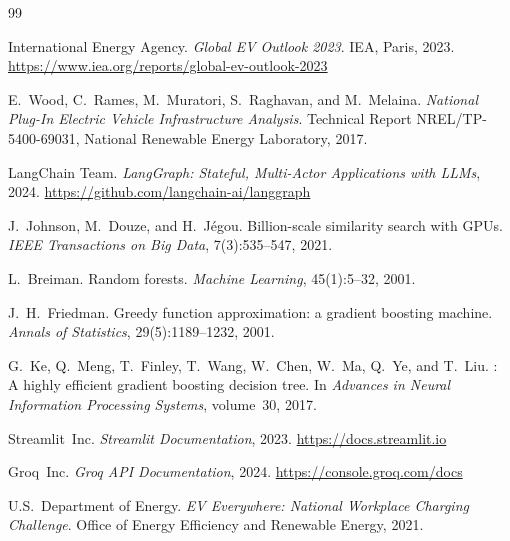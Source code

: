 \documentclass[12pt,a4paper]{article}
\begin{document}

\begin{thebibliography}{99}

International Energy Agency.
\newblock \textit{Global EV Outlook 2023}.
\newblock IEA, Paris, 2023.
\newblock \url{https://www.iea.org/reports/global-ev-outlook-2023}

E.~Wood, C.~Rames, M.~Muratori, S.~Raghavan, and M.~Melaina.
\newblock \textit{National Plug-In Electric Vehicle Infrastructure Analysis}.
\newblock Technical Report NREL/TP-5400-69031, National Renewable Energy
  Laboratory, 2017.

LangChain Team.
\newblock \textit{LangGraph: Stateful, Multi-Actor Applications with LLMs},
  2024.
\newblock \url{https://github.com/langchain-ai/langgraph}

J.~Johnson, M.~Douze, and H.~J{\'e}gou.
\newblock Billion-scale similarity search with {GPU}s.
\newblock \textit{IEEE Transactions on Big Data}, 7(3):535--547, 2021.

L.~Breiman.
\newblock Random forests.
\newblock \textit{Machine Learning}, 45(1):5--32, 2001.

J.~H.~Friedman.
\newblock Greedy function approximation: a gradient boosting machine.
\newblock \textit{Annals of Statistics}, 29(5):1189--1232, 2001.

G.~Ke, Q.~Meng, T.~Finley, T.~Wang, W.~Chen, W.~Ma, Q.~Ye, and T.~Liu.
: A highly efficient gradient boosting decision tree.
\newblock In \textit{Advances in Neural Information Processing Systems},
  volume~30, 2017.

Streamlit~Inc.
\newblock \textit{Streamlit Documentation}, 2023.
\newblock \url{https://docs.streamlit.io}

Groq~Inc.
\newblock \textit{Groq API Documentation}, 2024.
\newblock \url{https://console.groq.com/docs}

U.S.~Department of Energy.
\newblock \textit{EV Everywhere: National Workplace Charging Challenge}.
\newblock Office of Energy Efficiency and Renewable Energy, 2021.

\end{thebibliography}
\end{document}

